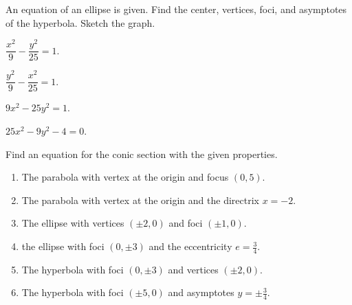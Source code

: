 \begin{exercise}
    An equation of an ellipse is given. Find the center, vertices, foci, and asymptotes of the hyperbola. Sketch the graph.\\
    \begin{enumerate*}
        \item $\dfrac{x^2}{9}-\dfrac{y^2}{25}=1$.
        \item $\dfrac{y^2}{9}-\dfrac{x^2}{25}=1$.
        \item $9x^2-25y^2=1$.
        \item $25x^2-9y^2-4=0$.
    \end{enumerate*}
\end{exercise}
\vspace*{10\baselineskip}

\begin{exercise}
    Find an equation for
    the conic section with the given properties.
    \begin{enumerate}
        \item The parabola with vertex at the origin and focus $(0, 5)$.
        \item The parabola with vertex at the origin and the directrix $x=-2$.
        \item The ellipse with vertices $(\pm 2, 0)$ and foci $(\pm 1, 0)$.
        \item the ellipse with foci $(0,\pm 3)$ and the eccentricity $e=\frac34$.
        \item The hyperbola with foci $(0,\pm 3)$ and vertices $(\pm 2, 0)$.
        \item The hyperbola with foci $(\pm 5, 0)$ and asymptotes $y=\pm\frac34$.
    \end{enumerate}
\end{exercise}

